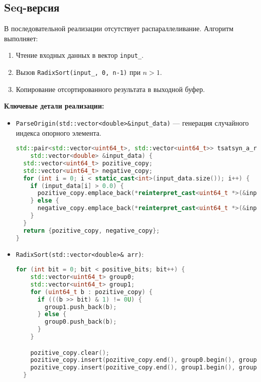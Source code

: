 \documentclass[a4paper,12pt]{article}
\begin{document}
\subsection{Seq-версия}
\hspace*{1.25em}В последовательной реализации отсутствует распараллеливание. Алгоритм выполняет:
\begin{enumerate}
    \item Чтение входных данных в вектор \texttt{input\_}.
    \item Вызов \texttt{RadixSort(input\_, 0, n-1)} при $n>1$.
    \item Копирование отсортированного результата в выходной буфер.
\end{enumerate}
\noindent\textbf{Ключевые детали реализации:}
\begin{itemize}
    \item \texttt{ParseOrigin(std::vector<double>\&input\_data)} — генерация случайного индекса опорного элемента.
     \begin{lstlisting}[language=C++,
    breaklines=true,       % Автоматический перенос строк
    columns=fullflexible ]
std::pair<std::vector<uint64_t>, std::vector<uint64_t>> tsatsyn_a_radix_sort_simple_merge_seq::ParseOrigin(
    std::vector<double> &input_data) {
  std::vector<uint64_t> pozitive_copy;
  std::vector<uint64_t> negative_copy;
  for (int i = 0; i < static_cast<int>(input_data.size()); i++) {
    if (input_data[i] > 0.0) {
      pozitive_copy.emplace_back(*reinterpret_cast<uint64_t *>(&input_data[i]));
    } else {
      negative_copy.emplace_back(*reinterpret_cast<uint64_t *>(&input_data[i]));
    }
  }
  return {pozitive_copy, negative_copy};
}
    \end{lstlisting}
    \item \texttt{RadixSort(std::vector<double>\& arr)}:
    \begin{lstlisting}[language=C++,
    breaklines=true,       % Автоматический перенос строк
    columns=fullflexible ]
for (int bit = 0; bit < positive_bits; bit++) {
    std::vector<uint64_t> group0;
    std::vector<uint64_t> group1;
    for (uint64_t b : pozitive_copy) {
      if (((b >> bit) & 1) != 0U) {
        group1.push_back(b);
      } else {
        group0.push_back(b);
      }
    }

    pozitive_copy.clear();
    pozitive_copy.insert(pozitive_copy.end(), group0.begin(), group0.end());
    pozitive_copy.insert(pozitive_copy.end(), group1.begin(), group1.end());
  }
    \end{lstlisting}

\end{itemize}
\end{document}

